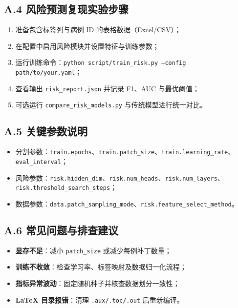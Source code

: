 \subsection*{A.4 风险预测复现实验步骤}
\begin{enumerate}
\item 准备包含标签列与病例 ID 的表格数据（Excel/CSV）；
\item 在配置中启用风险模块并设置特征与训练参数；
\item 运行训练命令：\texttt{python script/train\_risk.py --config path/to/your.yaml}；
\item 查看输出 \texttt{risk\_report.json} 并记录 F1、AUC 与最优阈值；
\item 可选运行 \texttt{compare\_risk\_models.py} 与传统模型进行统一对比。
\end{enumerate}

\subsection*{A.5 关键参数说明}
\begin{itemize}
\item 分割参数：\texttt{train.epochs}、\texttt{train.patch\_size}、\texttt{train.learning\_rate}、\texttt{eval\_interval}；
\item 风险参数：\texttt{risk.hidden\_dim}、\texttt{risk.num\_heads}、\texttt{risk.num\_layers}、\texttt{risk.threshold\_search\_steps}；
\item 数据参数：\texttt{data.patch\_sampling\_mode}、\texttt{risk.feature\_select\_method}。
\end{itemize}

\subsection*{A.6 常见问题与排查建议}
\begin{itemize}
\item \textbf{显存不足}：减小 \texttt{patch\_size} 或减少每例补丁数量；
\item \textbf{训练不收敛}：检查学习率、标签映射及数据归一化流程；
\item \textbf{指标异常波动}：固定随机种子并核查数据划分一致性；
\item \textbf{LaTeX 目录报错}：清理 \texttt{.aux/.toc/.out} 后重新编译。
\end{itemize}
